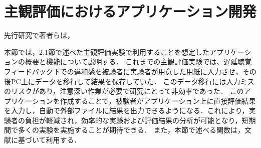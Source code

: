 \section{主観評価におけるアプリケーション開発}
先行研究\cite{cf:kayama}で著者らは，

本節では，2.1節で述べた主観評価実験で利用することを想定したアプリケーションの概要と機能について説明する．
これまでの主観評価実験では、遅延聴覚フィードバック下での違和感を被験者に実験者が用意した用紙に入力させ，その後PC上にデータを移行して結果を保存していた．
このデータ移行には入力ミスのリスクがあり，注意深い作業が必要で研究にとって非効率であった．
このアプリケーションを作成することで，被験者がアプリケーション上に直接評価結果を入力し，自動で外部ファイルに結果を出力できるようになる．これにより，実験者の負担が軽減され，効率的な実験および評価結果の分析が可能となり，短期間で多くの実験を実施することが期待できる．
また，本節で述べる関数は，文献\cite{Win32API-reference}に基づいて利用する．
